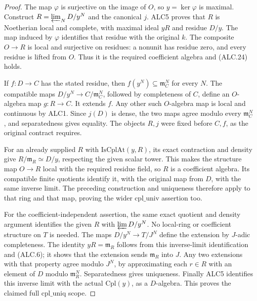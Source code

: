 \begin{proof}
The map \(\varphi\) is surjective on the image of \(O\),
so \(y=\ker\varphi\) is maximal.  Construct
\(R=\varprojlim_N D/y^N\) and the canonical \(j\).
ALC5 proves that \(R\) is Noetherian local and complete,
with maximal ideal \(yR\) and residue \(D/y\).
The map induced by \(\varphi\) identifies that residue
with the original \(k\).  The composite \(O\to R\)
is local and surjective on residues: a nonunit has residue
zero, and every residue is lifted from \(O\).  Thus it
is the required coefficient algebra and (ALC.24) holds.

If \(f:D\to C\) has the stated residue, then
\(f(y^N)\subseteq\mathfrak m_C^N\) for every \(N\).
The compatible maps
\(D/y^N\to C/\mathfrak m_C^N\), followed by completeness
of \(C\), define an \(O\)-algebra map \(g:R\to C\).
It extends \(f\).  Any other such \(O\)-algebra map is
local and continuous by ALC1.  Since \(j(D)\) is dense,
the two maps agree modulo every \(\mathfrak m_C^N\),
and separatedness gives equality.  The objects \(R,j\)
were fixed before \(C,f\), as the original contract requires.

For an already supplied \(R\) with
\(\mathrm{IsCplAt}(y,R)\), its exact contraction and
density give \(R/\mathfrak m_R\simeq D/y\), respecting
the given scalar tower.  This makes the structure map
\(O\to R\) local with the required residue field, so
\(R\) is a coefficient algebra.  Its compatible finite
quotients identify it, with the original map from \(D\),
with the same inverse limit.  The preceding construction
and uniqueness therefore apply to that ring and that map,
proving the wider \(\mathrm{cpl\_univ}\) assertion too.

For the coefficient-independent assertion, the same exact
quotient and density argument identifies the given \(R\)
with \(\varprojlim D/y^N\).  No local-ring or coefficient
structure on \(T\) is needed.  The maps
\(D/y^N\to T/J^N\) define the extension by \(J\)-adic
completeness.  The identity \(yR=\mathfrak m_R\) follows
from this inverse-limit identification and (ALC.6); it
shows that the extension sends \(\mathfrak m_R\) into
\(J\).  Any two extensions with that property agree
modulo \(J^N\), by approximating each \(r\in R\) with
an element of \(D\) modulo \(\mathfrak m_R^N\).
Separatedness gives uniqueness.  Finally ALC5 identifies
this inverse limit with the actual \(\mathrm{Cpl}(y)\),
as a \(D\)-algebra.  This proves the claimed full
\(\mathrm{cpl\_uniq}\) scope.
\end{proof}

